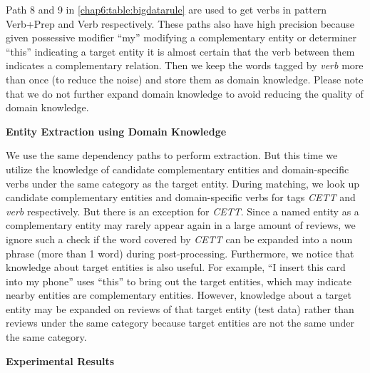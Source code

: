 Path 8 and 9 in \ref{chap6:table:bigdatarule} are used to get verbs in pattern Verb+Prep and Verb respectively. These paths also have high precision because given possessive modifier ``my'' modifying a complementary entity or determiner ``this'' indicating a target entity it is almost certain that the verb between them indicates a complementary relation. Then we keep the words tagged by \textit{verb} more than once (to reduce the noise) and store them as domain knowledge. Please note that we do not further expand domain knowledge to avoid reducing the quality of domain knowledge. 

\textbf{Entity Extraction using Domain Knowledge}

We use the same dependency paths to perform extraction. But this time we utilize the knowledge of candidate complementary entities and domain-specific verbs under the same category as the target entity. During matching, we look up candidate complementary entities and domain-specific verbs for tags \textit{CETT} and \textit{verb} respectively. But there is an exception for \textit{CETT}. Since a named entity as a complementary entity may rarely appear again in a large amount of reviews, we ignore such a check if the word covered by \textit{CETT} can be expanded into a noun phrase (more than 1 word) during post-processing. Furthermore, we notice that knowledge about target entities is also useful. For example, ``I insert this card into my phone'' uses ``this'' to bring out the target entities, which may indicate nearby entities are complementary entities. However, knowledge about a target entity may be expanded on reviews of that target entity (test data) rather than reviews under the same category because target entities are not the same under the same category.

\textbf{Experimental Results}
\label{chap6:sec:cer:exp}

\begin{table}
\centering
{}
\caption{Statistics of the CER dataset}
\label{table:testingdata}
\end{table}

